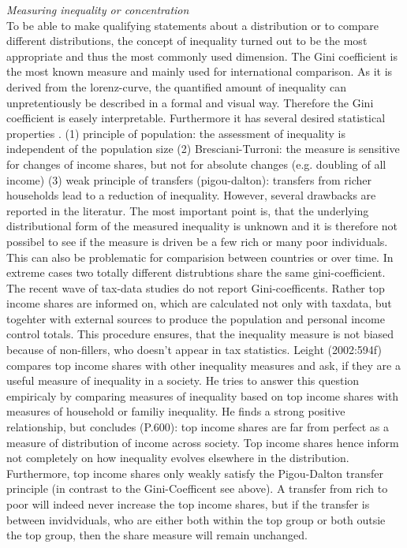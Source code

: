 \documentclass[twoside]{article}\usepackage[]{graphicx}\usepackage[]{color}
\begin{document}
\begin{multicols}{2}
\emph{Measuring inequality or concentration} \\
To be able to make qualifying statements about a distribution or to compare different distributions, the concept of inequality turned out to be the most appropriate and thus the most commonly used dimension. The Gini coefficient is the most known measure and mainly used for international comparison. As it is derived from the lorenz-curve, the quantified amount of inequality can unpretentiously be described in a formal and visual way. Therefore the Gini coefficient is easely interpretable. Furthermore it has several desired statistical properties \citet{engelhardt_modelle_2000}. (1) principle of population: the assessment of inequality is independent of the population size (2) Bresciani-Turroni: the measure is sensitive for changes of income shares, but not for absolute changes (e.g. doubling of all income) (3) weak principle of transfers (pigou-dalton): transfers from richer households lead to a reduction of inequality. However, several drawbacks are reported in the literatur. The most important point is, that the underlying distributional form of the measured inequality is unknown and it is therefore not possibel to see if the measure is driven be a few rich or many poor individuals. This can also be problematic for comparision between countries or over time. In extreme cases two totally different distrubtions share the same gini-coefficient.\\

The recent wave of tax-data studies do not report Gini-coefficents. Rather top income shares are informed on, which are calculated not only with taxdata, but togehter with external sources to produce the population and personal income control totals. This procedure ensures, that the inequality measure is not biased because of non-fillers, who doesn't appear in tax statistics.  Leight (2002:594f) compares top income shares with other inequality measures and ask, if they are a useful measure of inequality in a society. He tries to answer this question empiricaly by comparing measures of inequality based on top income shares with measures of household or familiy inequality. He finds a strong positive relationship, but concludes (P.600): top income shares are far from perfect as a measure of distribution of income across society. Top income shares hence inform not completely on how inequality evolves elsewhere in the distribution. Furthermore, top income shares only weakly satisfy the Pigou-Dalton transfer principle (in contrast to the Gini-Coefficent see above). A transfer from rich to poor will indeed never increase the top income shares, but if the transfer is between invidviduals, who are either both within the top group or both outsie the top group, then the share measure will remain unchanged. \\


\end{multicols}
\end{document}
